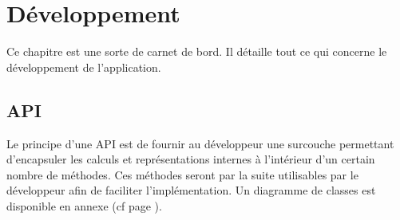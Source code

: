 \documentclass[a4paper]{memoir}
\begin{document}
	\chapter{Développement}
		\label{dev}
		Ce chapitre est une sorte de carnet de bord. Il détaille tout ce qui concerne le développement de l'application.
		
		\section{API}
			\label{api-dev}
			Le principe d'une API est de fournir au développeur une surcouche permettant d'encapsuler les calculs et représentations internes à l'intérieur 
			d'un certain nombre de méthodes. Ces méthodes seront par la suite utilisables par le développeur afin de faciliter l'implémentation. Un 
			diagramme de classes est disponible en annexe (cf page \pageref{fig:diagClass}).
			
\end{document}

